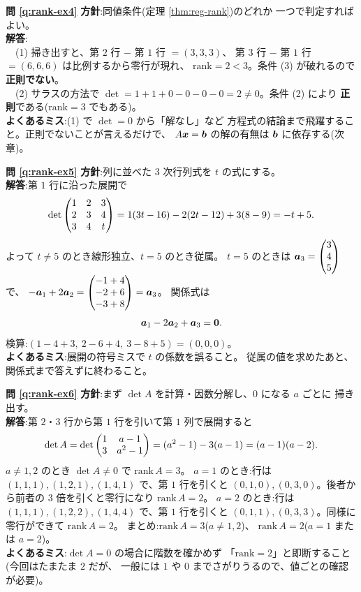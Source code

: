 \bigskip
\noindent\textbf{問 \ref{q:rank-ex4}}\quad
\textbf{方針}:同値条件(定理 \ref{thm:reg-rank})のどれか
一つで判定すればよい。\\
\textbf{解答}:\\
　(1) 掃き出すと、第 $2$ 行 $-$ 第 $1$ 行 $= (3,3,3)$、
第 $3$ 行 $-$ 第 $1$ 行 $= (6,6,6)$ は比例するから零行が現れ、
$\mathrm{rank} = 2 < 3$。条件 (3) が破れるので\textbf{正則でない}。\\
　(2) サラスの方法で
$\det = 1 + 1 + 0 - 0 - 0 - 0 = 2 \neq 0$。条件 (2) により
\textbf{正則}である($\mathrm{rank} = 3$ でもある)。\\
\textbf{よくあるミス}:(1) で $\det = 0$ から「解なし」など
方程式の結論まで飛躍すること。正則でないことが言えるだけで、
$A\bm{x} = \bm{b}$ の解の有無は $\bm{b}$ に依存する(次章)。

\bigskip
\noindent\textbf{問 \ref{q:rank-ex5}}\quad
\textbf{方針}:列に並べた $3$ 次行列式を $t$ の式にする。\\
\textbf{解答}:第 $1$ 行に沿った展開で
\[
\det \begin{pmatrix}1 & 2 & 3 \\ 2 & 3 & 4 \\ 3 & 4 & t\end{pmatrix}
= 1(3t - 16) - 2(2t - 12) + 3(8 - 9) = -t + 5.
\]
よって $t \neq 5$ のとき線形独立、$t = 5$ のとき従属。
$t = 5$ のときは $\bm{a}_3 = \begin{pmatrix}3 \\ 4 \\ 5\end{pmatrix}$ で、
$-\bm{a}_1 + 2\bm{a}_2 = \begin{pmatrix}-1 + 4 \\ -2 + 6 \\ -3 + 8\end{pmatrix} = \bm{a}_3$。
関係式は
\[
\bm{a}_1 - 2\bm{a}_2 + \bm{a}_3 = \bm{0}.
\]
検算:$(1 - 4 + 3,\ 2 - 6 + 4,\ 3 - 8 + 5) = (0, 0, 0)$。\\
\textbf{よくあるミス}:展開の符号ミスで $t$ の係数を誤ること。
従属の値を求めたあと、関係式まで答えずに終わること。

\bigskip
\noindent\textbf{問 \ref{q:rank-ex6}}\quad
\textbf{方針}:まず $\det A$ を計算・因数分解し、$0$ になる $a$ ごとに
掃き出す。\\
\textbf{解答}:第 $2$・$3$ 行から第 $1$ 行を引いて第 $1$ 列で展開すると
\[
\det A = \det \begin{pmatrix}1 & a - 1 \\ 3 & a^2 - 1\end{pmatrix}
= (a^2 - 1) - 3(a - 1) = (a - 1)(a - 2).
\]
$a \neq 1, 2$ のとき $\det A \neq 0$ で $\mathrm{rank}\,A = 3$。
$a = 1$ のとき:行は $(1,1,1), (1,2,1), (1,4,1)$ で、第 $1$ 行を引くと
$(0,1,0), (0,3,0)$。後者から前者の $3$ 倍を引くと零行になり
$\mathrm{rank}\,A = 2$。
$a = 2$ のとき:行は $(1,1,1), (1,2,2), (1,4,4)$ で、第 $1$ 行を引くと
$(0,1,1), (0,3,3)$。同様に零行ができて $\mathrm{rank}\,A = 2$。
まとめ:$\mathrm{rank}\,A = 3$($a \neq 1, 2$)、
$\mathrm{rank}\,A = 2$($a = 1$ または $a = 2$)。\\
\textbf{よくあるミス}:$\det A = 0$ の場合に階数を確かめず
「$\mathrm{rank} = 2$」と即断すること(今回はたまたま $2$ だが、
一般には $1$ や $0$ までさがりうるので、値ごとの確認が必要)。

